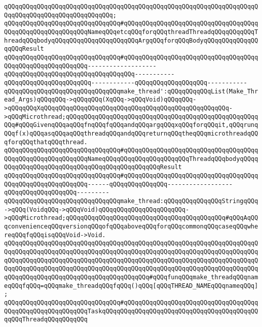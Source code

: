 \verb|qQQqqQQqqQQqqQQqqQQqqQQqqQQqqQQqqQQqqQQqqQQqqQQqqQQqqQQqqQQqqQQqqQQqqQQqqQQqqQQqqQQqqQQqqQQqqQQqqQQq;|\newline
\newline
\verb|qQQqqQQqqQQqqQQqqQQqqQQqqQQqqQQq#qQQqqQQqqQQqqQQqqQQqqQQqqQQqqQQqqQQqqQQqqQQqqQQqqQQqqQQqqQQqNameqQQqetcqQQqforqQQqthreadThreadqQQqqQQqqQQqThreadqQQqbodyqQQqqQQqqQQqqQQqqQQqqQQqArgqQQqforqQQqBodyqQQqqQQqqQQqqQQqqQQqResult|\newline
\verb|qQQqqQQqqQQqqQQqqQQqqQQqqQQqqQQq#qQQqqQQqqQQqqQQqqQQqqQQqqQQqqQQqqQQqqQQqqQQqqQQqqQQqqQQqqQQq-------------------qQQqqQQqqQQqqQQqqQQqqQQqqQQqqQQqqQQq-----------qQQqqQQqqQQqqQQqqQQqqQQq------------qQQqqQQqqQQqqQQqqQQq-----------|\newline
\verb|qQQqqQQqqQQqqQQqqQQqqQQqqQQqqQQqmake_thread':qQQqqQQqqQQqList(Make_Thread_Args)qQQqqQQq->qQQqqQQq(XqQQq->qQQqVoid)qQQqqQQq->qQQqqQQqXqQQqqQQqqQQqqQQqqQQqqQQqqQQqqQQqqQQqqQQqqQQqqQQqqQQq->qQQqMicrothread;qQQqqQQqqQQqqQQqqQQqqQQqqQQqqQQqqQQqqQQqqQQqqQQqqQQqqQQq#qQQqGivenqQQqaqQQqfnqQQqfqQQqandqQQqargqQQqxqQQqforqQQqit,qQQqrunqQQqf(x)qQQqasqQQqaqQQqthreadqQQqandqQQqreturnqQQqtheqQQqmicrothreadqQQqforqQQqthatqQQqthread.|\newline
\newline
\verb|qQQqqQQqqQQqqQQqqQQqqQQqqQQqqQQq#qQQqqQQqqQQqqQQqqQQqqQQqqQQqqQQqqQQqqQQqqQQqqQQqqQQqqQQqqQQqNameqQQqqQQqqQQqqQQqqQQqqQQqThreadqQQqbodyqQQqqQQqqQQqqQQqqQQqqQQqqQQqqQQqqQQqqQQqqQQqqQQqResult|\newline
\verb|qQQqqQQqqQQqqQQqqQQqqQQqqQQqqQQq#qQQqqQQqqQQqqQQqqQQqqQQqqQQqqQQqqQQqqQQqqQQqqQQqqQQqqQQqqQQq------qQQqqQQqqQQqqQQq------------------qQQqqQQqqQQqqQQqqQQq---------|\newline
\verb|qQQqqQQqqQQqqQQqqQQqqQQqqQQqqQQqmake_thread:qQQqqQQqqQQqqQQqStringqQQq->qQQq(VoidqQQq->qQQqVoid)qQQqqQQqqQQqqQQqqQQqqQQq->qQQqMicrothread;qQQqqQQqqQQqqQQqqQQqqQQqqQQqqQQqqQQqqQQqqQQq#qQQqAqQQqconvenienceqQQqversionqQQqofqQQqaboveqQQqforqQQqcommonqQQqcaseqQQqwhereqQQqfqQQqisqQQqVoid->Void.|\newline
\verb|qQQqqQQqqQQqqQQqqQQqqQQqqQQqqQQqqQQqqQQqqQQqqQQqqQQqqQQqqQQqqQQqqQQqqQQqqQQqqQQqqQQqqQQqqQQqqQQqqQQqqQQqqQQqqQQqqQQqqQQqqQQqqQQqqQQqqQQqqQQqqQQqqQQqqQQqqQQqqQQqqQQqqQQqqQQqqQQqqQQqqQQqqQQqqQQqqQQqqQQqqQQqqQQqqQQqqQQqqQQqqQQqqQQqqQQqqQQqqQQqqQQqqQQqqQQqqQQqqQQqqQQqqQQqqQQqqQQqqQQqqQQqqQQqqQQqqQQqqQQqqQQqqQQqqQQqqQQqqQQq#qQQqfunqQQqmake_threadqQQqnameqQQqfqQQq=qQQqmake_threadqQQqfqQQq()qQQq[qQQqTHREAD_NAMEqQQqnameqQQq];|\newline
\verb|qQQqqQQqqQQqqQQqqQQqqQQqqQQqqQQq#qQQqqQQqqQQqqQQqqQQqqQQqqQQqqQQqqQQqqQQqqQQqqQQqqQQqqQQqqQQqTaskqQQqqQQqqQQqqQQqqQQqqQQqqQQqqQQqqQQqqQQqqQQqqQQqThreadqQQqqQQqqQQq|\newline
